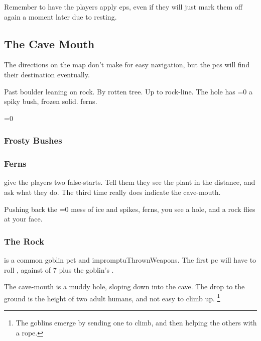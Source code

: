 \begin{multicols}{2}
Remember to have the players apply \glspl{ep}, even if they will just mark them off again a moment later due to resting.

\subsection{The Cave Mouth}

The directions on the map don't make for easy navigation, but the \glspl{pc} will find their destination eventually.

\begin{exampletext}
  Past boulder leaning on rock.
  By rotten tree.
  Up to rock-line.
  The hole has
  \ifnum\value{temperature}=0
    a spiky bush, frozen solid.
  \else
    ferns.
  \fi
\end{exampletext}

\ifnum\value{temperature}=0
  \subsubsection{Frosty Bushes}
\else
  \subsubsection{Ferns}
\fi
give the players two false-starts.
Tell them they see the plant in the distance, and ask what they do.
The third time really does indicate the cave-mouth.

\begin{boxtext}
  Pushing back the
  \ifnum\value{temperature}=0%
    mess of ice and spikes,
  \else%
    ferns,
  \fi%
  you see a hole, and a rock flies at your face.
\end{boxtext}

\subsubsection{The Rock}
is a common goblin pet and \gls{impromptuThrownWeapons}.
The first \gls{pc} will have to roll , against  of 7 plus the goblin's .

The cave-mouth is a muddy hole, sloping down into the cave.
The drop to the ground is the height of two adult humans, and not easy to climb up.%
\footnote{The goblins emerge by sending one to climb, and then helping the others with a rope.}

\end{multicols}

\needspace{15em}
